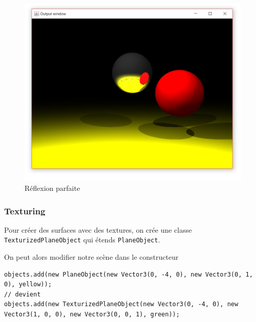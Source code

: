 \begin{figure}[H]
	\caption{\label{10_3} Réflexion parfaite}
	\centering
	\includegraphics[scale = 0.4]{Figures/10_3.png}
\end{figure}

\subsubsection{Texturing}

Pour créer des surfaces avec des textures, on crée une classe \texttt{TexturizedPlaneObject} qui étends \texttt{PlaneObject}.


On peut alors modifier notre scène dans le constructeur

\begin{lstlisting}
objects.add(new PlaneObject(new Vector3(0, -4, 0), new Vector3(0, 1, 0), yellow));
// devient
objects.add(new TexturizedPlaneObject(new Vector3(0, -4, 0), new Vector3(1, 0, 0), new Vector3(0, 0, 1), green));
\end{lstlisting}

